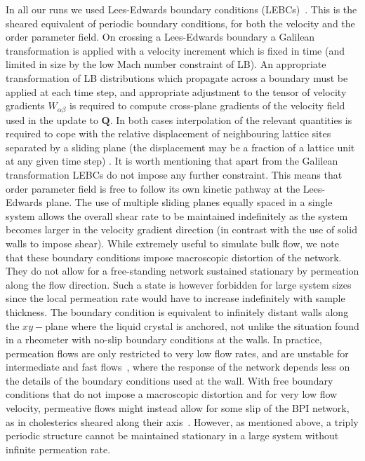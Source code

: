 \documentclass[8.5pt,twoside,twocolumn]{article}
\begin{document}
In all our runs we used Lees-Edwards boundary conditions (LEBCs)~\cite{Wagner:2002}.
This is the sheared equivalent of periodic boundary conditions, for both the 
velocity and the order parameter field. 
On crossing a Lees-Edwards boundary a Galilean transformation is applied
with a velocity increment which is fixed in time (and limited in size by the
low Mach number constraint of LB). An appropriate transformation
of LB distributions which propagate across a boundary
must be applied at each time step, and appropriate
adjustment to the tensor of velocity gradients $W_{\alpha\beta}$ 
is required to compute cross-plane gradients of the velocity field 
used in the update to ${\mathbf Q}$. In both cases interpolation of the
relevant quantities is required to cope with the relative displacement
of neighbouring lattice sites separated by a sliding plane (the
displacement may be a fraction of a lattice unit at any given time
step) \cite{Henrich:2012a}. It is worth mentioning that apart from 
the Galilean transformation LEBCs do not impose any further constraint.
This means that order parameter field is free to follow its own kinetic pathway
at the Lees-Edwards plane. 
The use of multiple sliding planes equally spaced in a single
system allows the overall shear rate to be maintained indefinitely as the system
becomes larger in the velocity gradient direction (in contrast with the use of solid
walls to impose shear).
While extremely useful to simulate bulk flow, we
note that these boundary conditions impose macroscopic distortion
of the network. They do not allow for a free-standing network 
sustained stationary by permeation along the flow direction.
Such a state is however forbidden for large system sizes since the 
local permeation rate would have to increase indefinitely with 
sample thickness.
The boundary condition is equivalent to infinitely distant
walls along the $xy-$plane where the liquid crystal is anchored,
not unlike the situation found in a rheometer with no-slip
boundary conditions at the walls.
In practice, permeation flows are 
only restricted to very low flow rates, and are unstable for intermediate 
and fast flows~\cite{Dupuis:2005}, 
where the response of the network depends less on
the details of the boundary conditions used at the wall.
With free boundary conditions that do not impose a macroscopic distortion 
and for very low flow velocity, 
permeative flows might instead allow for
some slip of the BPI network, as in cholesterics sheared
along their axis~\cite{Marenduzzo:2006a, Marenduzzo:2006b}.
However, as mentioned above, a triply periodic structure cannot
be maintained stationary in a large system without infinite 
permeation rate.
\end{document}
